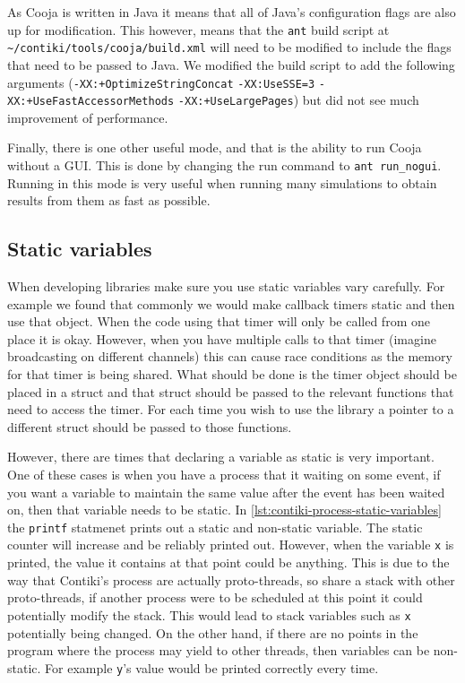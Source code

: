 As Cooja is written in Java \cite{?} it means that all of Java's configuration flags are also up for modification. This however, means that the \verb|ant| build script at \verb|~/contiki/tools/cooja/build.xml| will need to be modified to include the flags that need to be passed to Java. We modified the build script to add the following arguments (\verb|-XX:+OptimizeStringConcat| \verb|-XX:UseSSE=3| \verb|-XX:+UseFastAccessorMethods| \verb|-XX:+UseLargePages|) but did not see much improvement of performance.

Finally, there is one other useful mode, and that is the ability to run Cooja without a GUI. This is done by changing the run command to \verb|ant run_nogui|. Running in this mode is very useful when running many simulations to obtain results from them as fast as possible.


\subsection{Static variables}

When developing libraries make sure you use static variables vary carefully. For example we found that commonly we would make callback timers static and then use that object. When the code using that timer will only be called from one place it is okay. However, when you have multiple calls to that timer (imagine broadcasting on different channels) this can cause race conditions as the memory for that timer is being shared. What should be done is the timer object should be placed in a struct and that struct should be passed to the relevant functions that need to access the timer. For each time you wish to use the library a pointer to a different struct should be passed to those functions.

However, there are times that declaring a variable as static is very important. One of these cases is when you have a process that it waiting on some event, if you want a variable to maintain the same value after the event has been waited on, then that variable needs to be static. In \autoref{lst:contiki-process-static-variables} the \verb|printf| statmenet prints out a static and non-static variable. The static counter will increase and be reliably printed out. However, when the variable \verb|x| is printed, the value it contains at that point could be anything. This is due to the way that Contiki's process are actually proto-threads, so share a stack with other proto-threads, if another process were to be scheduled at this point it could potentially modify the stack. This would lead to stack variables such as \verb|x| potentially being changed. On the other hand, if there are no points in the program where the process may yield to other threads, then variables can be non-static. For example \verb|y|'s value would be printed correctly every time.

